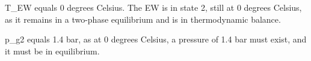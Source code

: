 T_EW equals 0 degrees Celsius.  
The EW is in state 2, still at 0 degrees Celsius, as it remains in a two-phase equilibrium and is in thermodynamic balance.  

p_g2 equals 1.4 bar, as at 0 degrees Celsius, a pressure of 1.4 bar must exist, and it must be in equilibrium.